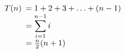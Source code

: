 




\[ 
T(n) \begin{array}[t]{l} = 1 + 2 + 3 + \ldots + (n-1)  \\
 =  \displaystyle{ \sum_{i=1}^{n-1}{i} } \\
 =  \frac{n}{2}(n+1) \nonumber \\
\end{array} \]

